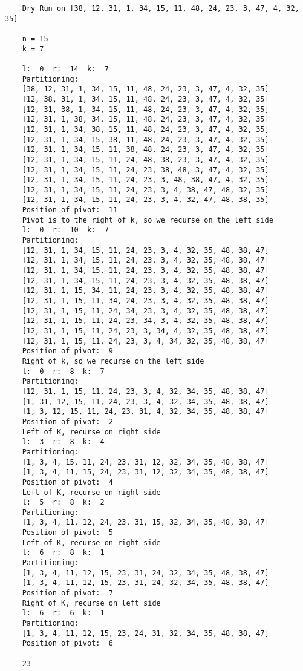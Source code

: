 \documentclass[11pt,largemargins]{homework}
\begin{document}
\begin{verbatim}
    Dry Run on [38, 12, 31, 1, 34, 15, 11, 48, 24, 23, 3, 47, 4, 32, 35]

    n = 15
    k = 7

    l:  0  r:  14  k:  7
    Partitioning:
    [38, 12, 31, 1, 34, 15, 11, 48, 24, 23, 3, 47, 4, 32, 35]
    [12, 38, 31, 1, 34, 15, 11, 48, 24, 23, 3, 47, 4, 32, 35]
    [12, 31, 38, 1, 34, 15, 11, 48, 24, 23, 3, 47, 4, 32, 35]
    [12, 31, 1, 38, 34, 15, 11, 48, 24, 23, 3, 47, 4, 32, 35]
    [12, 31, 1, 34, 38, 15, 11, 48, 24, 23, 3, 47, 4, 32, 35]
    [12, 31, 1, 34, 15, 38, 11, 48, 24, 23, 3, 47, 4, 32, 35]
    [12, 31, 1, 34, 15, 11, 38, 48, 24, 23, 3, 47, 4, 32, 35]
    [12, 31, 1, 34, 15, 11, 24, 48, 38, 23, 3, 47, 4, 32, 35]
    [12, 31, 1, 34, 15, 11, 24, 23, 38, 48, 3, 47, 4, 32, 35]
    [12, 31, 1, 34, 15, 11, 24, 23, 3, 48, 38, 47, 4, 32, 35]
    [12, 31, 1, 34, 15, 11, 24, 23, 3, 4, 38, 47, 48, 32, 35]
    [12, 31, 1, 34, 15, 11, 24, 23, 3, 4, 32, 47, 48, 38, 35]
    Position of pivot:  11
    Pivot is to the right of k, so we recurse on the left side
    l:  0  r:  10  k:  7
    Partitioning:
    [12, 31, 1, 34, 15, 11, 24, 23, 3, 4, 32, 35, 48, 38, 47]
    [12, 31, 1, 34, 15, 11, 24, 23, 3, 4, 32, 35, 48, 38, 47]
    [12, 31, 1, 34, 15, 11, 24, 23, 3, 4, 32, 35, 48, 38, 47]
    [12, 31, 1, 34, 15, 11, 24, 23, 3, 4, 32, 35, 48, 38, 47]
    [12, 31, 1, 15, 34, 11, 24, 23, 3, 4, 32, 35, 48, 38, 47]
    [12, 31, 1, 15, 11, 34, 24, 23, 3, 4, 32, 35, 48, 38, 47]
    [12, 31, 1, 15, 11, 24, 34, 23, 3, 4, 32, 35, 48, 38, 47]
    [12, 31, 1, 15, 11, 24, 23, 34, 3, 4, 32, 35, 48, 38, 47]
    [12, 31, 1, 15, 11, 24, 23, 3, 34, 4, 32, 35, 48, 38, 47]
    [12, 31, 1, 15, 11, 24, 23, 3, 4, 34, 32, 35, 48, 38, 47]
    Position of pivot:  9
    Right of k, so we recurse on the left side
    l:  0  r:  8  k:  7
    Partitioning:
    [12, 31, 1, 15, 11, 24, 23, 3, 4, 32, 34, 35, 48, 38, 47]
    [1, 31, 12, 15, 11, 24, 23, 3, 4, 32, 34, 35, 48, 38, 47]
    [1, 3, 12, 15, 11, 24, 23, 31, 4, 32, 34, 35, 48, 38, 47]
    Position of pivot:  2
    Left of K, recurse on right side
    l:  3  r:  8  k:  4
    Partitioning:
    [1, 3, 4, 15, 11, 24, 23, 31, 12, 32, 34, 35, 48, 38, 47]
    [1, 3, 4, 11, 15, 24, 23, 31, 12, 32, 34, 35, 48, 38, 47]
    Position of pivot:  4
    Left of K, recurse on right side
    l:  5  r:  8  k:  2
    Partitioning:
    [1, 3, 4, 11, 12, 24, 23, 31, 15, 32, 34, 35, 48, 38, 47]
    Position of pivot:  5
    Left of K, recurse on right side
    l:  6  r:  8  k:  1
    Partitioning:
    [1, 3, 4, 11, 12, 15, 23, 31, 24, 32, 34, 35, 48, 38, 47]
    [1, 3, 4, 11, 12, 15, 23, 31, 24, 32, 34, 35, 48, 38, 47]
    Position of pivot:  7
    Right of K, recurse on left side
    l:  6  r:  6  k:  1
    Partitioning:
    [1, 3, 4, 11, 12, 15, 23, 24, 31, 32, 34, 35, 48, 38, 47]
    Position of pivot:  6
    
    23

\end{verbatim}
\end{document}
